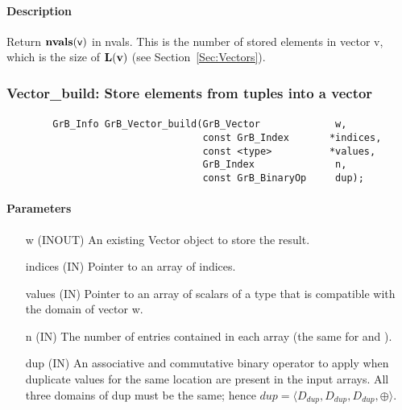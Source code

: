 \paragraph{Description}


Return $\mathbf{nvals}({\sf v})$ in {\sf nvals}. This is the number of stored 
elements in vector {\sf v}, which is the size of $\mathbf{L}({\bf v})$ (see 
Section~\ref{Sec:Vectors}).


\subsubsection{{\sf Vector\_build}: Store elements from tuples into a vector}
\label{Sec:Vector_build}

\paragraph{\syntax}

\begin{verbatim}
        GrB_Info GrB_Vector_build(GrB_Vector             w,
                                  const GrB_Index       *indices,
                                  const <type>          *values,
                                  GrB_Index              n,
                                  const GrB_BinaryOp     dup);
\end{verbatim}

\paragraph{Parameters}

\begin{itemize}[leftmargin=1.1in]
    \item[{\sf w}]       ({\sf INOUT}) An existing Vector object to store the result.
    \item[{\sf indices}] ({\sf IN}) Pointer to an array of indices. 
    \item[{\sf values}]  ({\sf IN}) Pointer to an array of scalars of a type that
                                     is compatible with the domain of vector {\sf w}.
    \item[{\sf n}]   ({\sf IN}) The number of entries contained in each array (the same for  and ).
    \item[{\sf dup}]     ({\sf IN}) An associative and commutative binary operator to apply when duplicate values for
	    the same location are present in the input arrays. All three domains of {\sf dup} must be the same; hence
	    $dup=\langle D_{dup},D_{dup},D_{dup},\oplus \rangle$.
\end{itemize}

